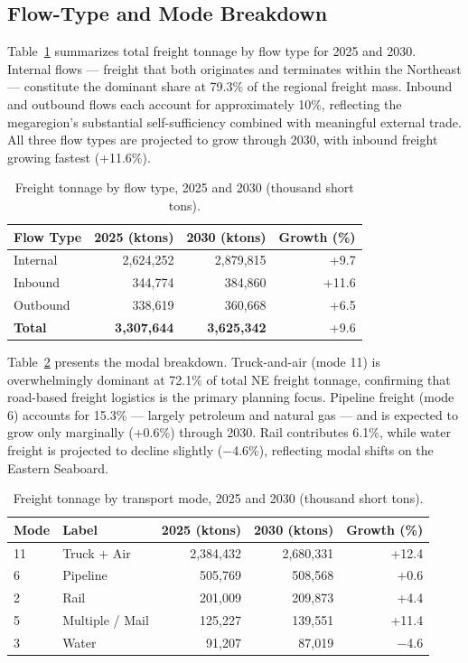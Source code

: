 \subsection{Flow-Type and Mode Breakdown}

Table~\ref{tab:task1-flow-type} summarizes total freight tonnage by flow type for
2025 and 2030. Internal flows — freight that both originates and terminates within the
Northeast — constitute the dominant share at 79.3\% of the regional freight mass.
Inbound and outbound flows each account for approximately 10\%, reflecting the
megaregion's substantial self-sufficiency combined with meaningful external trade.
All three flow types are projected to grow through 2030, with inbound freight growing
fastest (+11.6\%).

\begin{table}[H]
\centering
\caption{Freight tonnage by flow type, 2025 and 2030 (thousand short tons).}
\begin{tabular}{lrrr}
\toprule
Flow Type & 2025 (ktons) & 2030 (ktons) & Growth (\%) \\
\midrule
Internal  & 2{,}624{,}252 & 2{,}879{,}815 & +9.7 \\
Inbound   &   344{,}774 &   384{,}860 & +11.6 \\
Outbound  &   338{,}619 &   360{,}668 & +6.5 \\
\midrule
\textbf{Total} & \textbf{3{,}307{,}644} & \textbf{3{,}625{,}342} & +9.6 \\
\bottomrule
\end{tabular}
\label{tab:task1-flow-type}
\end{table}

Table~\ref{tab:task1-mode} presents the modal breakdown. Truck-and-air (mode 11)
is overwhelmingly dominant at 72.1\% of total NE freight tonnage, confirming that
road-based freight logistics is the primary planning focus. Pipeline freight (mode 6)
accounts for 15.3\% — largely petroleum and natural gas — and is expected to grow only
marginally (+0.6\%) through 2030. Rail contributes 6.1\%, while water freight is
projected to decline slightly ($-$4.6\%), reflecting modal shifts on the Eastern Seaboard.

\begin{table}[H]
\centering
\caption{Freight tonnage by transport mode, 2025 and 2030 (thousand short tons).}
\begin{tabular}{llrrr}
\toprule
Mode & Label & 2025 (ktons) & 2030 (ktons) & Growth (\%) \\
\midrule
11 & Truck + Air        & 2{,}384{,}432 & 2{,}680{,}331 & +12.4 \\
6  & Pipeline           &   505{,}769 &   508{,}568 & +0.6  \\
2  & Rail               &   201{,}009 &   209{,}873 & +4.4  \\
5  & Multiple / Mail    &   125{,}227 &   139{,}551 & +11.4 \\
3  & Water              &    91{,}207 &    87{,}019 & $-$4.6 \\
\bottomrule
\end{tabular}
\label{tab:task1-mode}
\end{table}

